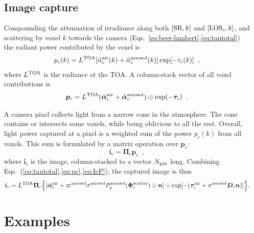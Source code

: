 \documentclass[10pt,letterpaper]{article}
\newcommand{\vect}[1]{\bm{#1}}
\begin{document}

\subsection{Image capture}
\label{sec:captured-image}

Compounding the attenuation of irradiance along both $[{\rm SR},k]$
and $[{\rm LOS}_c,k]$, and scattering by voxel $k$ towards the camera
(Eqs.~\ref{eq:beer-lambert},\ref{eq:tautotal}) the radiant power
contributed by the voxel is
\begin{equation}
  p_c(k)= L^{\rm TOA}
  [\tilde{\alpha}^{\rm air}_c(k) + \tilde{\alpha}^{\rm aerosol}_c(k)]
  \exp[-\tau_c(k)]
  \;\;,
  \label{eq:ick}
\end{equation}
where $L^{\rm TOA}$ is the radiance at the TOA. A column-stack vector
of all voxel contributions is
\begin{equation}
  {\bm p}_c= L^{\rm TOA}
  (\tilde{\vect{\alpha}}^{\rm air}_c + \tilde{\vect{\alpha}}^{\rm aerosol}_c)
  \odot \exp(-\vect{\tau}_c)
  \;\;.
  \label{eq:pc}
\end{equation}

A camera pixel collects light from a narrow cone in the
atmosphere. The cone contains or intersects some voxels, while being
oblivious to all the rest.  Overall, light power captured at a pixel
is a weighted sum of the power $p_c(k)$ from all voxels.  This sum is
formulated by a matrix operation over ${\bm p}_c$:
\begin{equation}
  {\bm i}_c= {\vect{\Pi}}_c{\bm p}_c
  \;\;,
  \label{eq:IcP}
\end{equation}
where ${\bm i}_c$ is the image, column-stacked to a vector $N_{\rm
  pix}$ long.  Combining
Eqs.~(\ref{eq:tautotal},\ref{eq:pc},\ref{eq:IcP}), the captured image
is thus
\begin{align}
  {\bm i}_c= L^{\rm TOA} {\vect{\Pi}}_c \Big\{
  [\tilde{\vect{\alpha}}^{\rm air}_c + \varpi^{\rm aerosol}\sigma^{\rm
    aerosol} P^{\rm aerosol}_g(\vect{\Phi}^{\rm scatter}_c) \odot{\bm
    n} ] \odot \exp[-(\vect{\tau}_c^{\rm air} + {\sigma}^{\rm aerosol}
  {\bm D}_c{\bm n})] \Big\} .
  \label{eq:bigIA}
\end{align}


\section{Examples}
\label{sec:simul}
\end{document}
